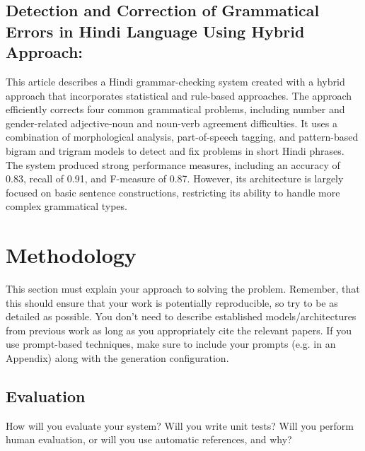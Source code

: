 \documentclass[11pt,a4paper]{article}
\begin{document}
\subsection{Detection and Correction of Grammatical Errors in Hindi Language Using Hybrid Approach:} 
This article describes a Hindi grammar-checking system created with a hybrid approach that incorporates statistical and rule-based approaches. The approach efficiently corrects four common grammatical problems, including number and gender-related adjective-noun and noun-verb agreement difficulties. It uses a combination of morphological analysis, part-of-speech tagging, and pattern-based bigram and trigram models to detect and fix problems in short Hindi phrases. The system produced strong performance measures, including an accuracy of 0.83, recall of 0.91, and F-measure of 0.87. However, its architecture is largely focused on basic sentence constructions, restricting its ability to handle more complex grammatical types.
\section{Methodology}

This section must explain your approach to solving the problem. Remember, that this should ensure that your work is potentially reproducible, so try to be as detailed as possible. You don't need to describe established models/architectures from previous work as long as you appropriately cite the relevant papers. If you use prompt-based techniques, make sure to include your prompts (e.g. in an Appendix) along with the generation configuration.

\subsection{Evaluation} 
How will you evaluate your system? Will you write unit tests? Will you perform human evaluation, or will you use automatic references, and why?
\end{document}
